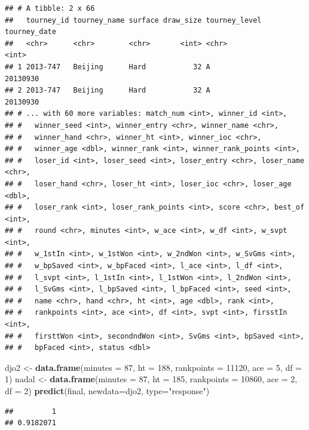 \documentclass[]{article}
\newenvironment{Shaded}{\begin{snugshade}}{\end{snugshade}}
\newcommand{\DataTypeTok}[1]{\textcolor[rgb]{0.13,0.29,0.53}{#1}}
\newcommand{\DecValTok}[1]{\textcolor[rgb]{0.00,0.00,0.81}{#1}}
\newcommand{\KeywordTok}[1]{\textcolor[rgb]{0.13,0.29,0.53}{\textbf{#1}}}
\newcommand{\NormalTok}[1]{#1}
\newcommand{\StringTok}[1]{\textcolor[rgb]{0.31,0.60,0.02}{#1}}
\begin{document}
\begin{verbatim}
## # A tibble: 2 x 66
##   tourney_id tourney_name surface draw_size tourney_level tourney_date
##   <chr>      <chr>        <chr>       <int> <chr>                <int>
## 1 2013-747   Beijing      Hard           32 A                 20130930
## 2 2013-747   Beijing      Hard           32 A                 20130930
## # ... with 60 more variables: match_num <int>, winner_id <int>,
## #   winner_seed <int>, winner_entry <chr>, winner_name <chr>,
## #   winner_hand <chr>, winner_ht <int>, winner_ioc <chr>,
## #   winner_age <dbl>, winner_rank <int>, winner_rank_points <int>,
## #   loser_id <int>, loser_seed <int>, loser_entry <chr>, loser_name <chr>,
## #   loser_hand <chr>, loser_ht <int>, loser_ioc <chr>, loser_age <dbl>,
## #   loser_rank <int>, loser_rank_points <int>, score <chr>, best_of <int>,
## #   round <chr>, minutes <int>, w_ace <int>, w_df <int>, w_svpt <int>,
## #   w_1stIn <int>, w_1stWon <int>, w_2ndWon <int>, w_SvGms <int>,
## #   w_bpSaved <int>, w_bpFaced <int>, l_ace <int>, l_df <int>,
## #   l_svpt <int>, l_1stIn <int>, l_1stWon <int>, l_2ndWon <int>,
## #   l_SvGms <int>, l_bpSaved <int>, l_bpFaced <int>, seed <int>,
## #   name <chr>, hand <chr>, ht <int>, age <dbl>, rank <int>,
## #   rankpoints <int>, ace <int>, df <int>, svpt <int>, firsstIn <int>,
## #   firsttWon <int>, secondndWon <int>, SvGms <int>, bpSaved <int>,
## #   bpFaced <int>, status <dbl>
\end{verbatim}

\begin{Shaded}
\begin{Highlighting}[]
\NormalTok{djo2 <-}\StringTok{ }\KeywordTok{data.frame}\NormalTok{(}\DataTypeTok{minutes =} \DecValTok{87}\NormalTok{, }\DataTypeTok{ht =} \DecValTok{188}\NormalTok{, }\DataTypeTok{rankpoints =} \DecValTok{11120}\NormalTok{, }\DataTypeTok{ace =} \DecValTok{5}\NormalTok{, }\DataTypeTok{df =} \DecValTok{1}\NormalTok{)}
\NormalTok{nadal <-}\StringTok{ }\KeywordTok{data.frame}\NormalTok{(}\DataTypeTok{minutes =} \DecValTok{87}\NormalTok{, }\DataTypeTok{ht =} \DecValTok{185}\NormalTok{, }\DataTypeTok{rankpoints =} \DecValTok{10860}\NormalTok{, }\DataTypeTok{ace =} \DecValTok{2}\NormalTok{, }\DataTypeTok{df =} \DecValTok{2}\NormalTok{)}
\KeywordTok{predict}\NormalTok{(final, }\DataTypeTok{newdata=}\NormalTok{djo2, }\DataTypeTok{type=}\StringTok{"response"}\NormalTok{)}
\end{Highlighting}
\end{Shaded}

\begin{verbatim}
##         1 
## 0.9182071
\end{verbatim}
\end{document}
